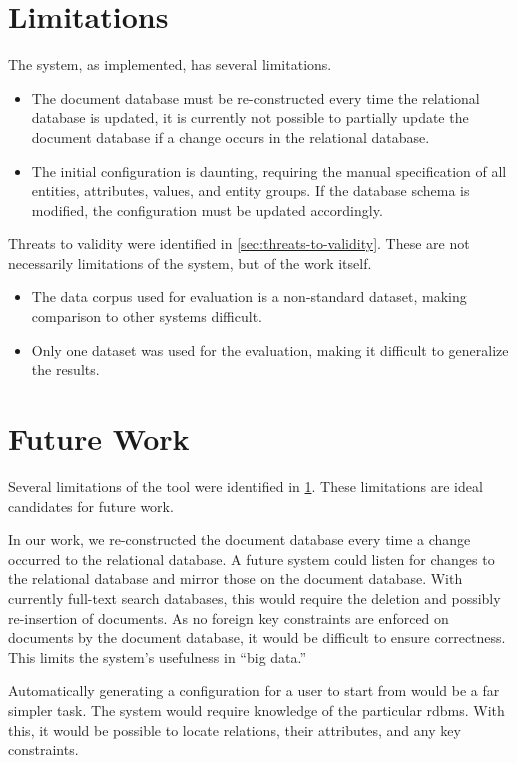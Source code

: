 	\section{Limitations}
	\label{sec:limitations}
		The system, as implemented, has several limitations.
		
		\begin{itemize}
			\item The document database must be re-constructed every time the relational database is updated, it is currently not possible to partially update the document database if a change occurs in the relational database.
			\item The initial configuration is daunting, requiring the manual specification of all entities, attributes, values, and entity groups.  If the database schema is modified, the configuration must be updated accordingly.
		\end{itemize}
		
		Threats to validity were identified in \cref{sec:threats-to-validity}.  These are not necessarily limitations of the system, but of the work itself.
		
		\begin{itemize}
			\item The data corpus used for evaluation is a non-standard dataset, making comparison to other systems difficult.
			\item Only one dataset was used for the evaluation, making it difficult to generalize the results.
		\end{itemize}
	
	\section{Future Work}
		Several limitations of the tool were identified in \cref{sec:limitations}.  These limitations are ideal candidates for future work.
		
		In our work, we re-constructed the document database every time a change occurred to the relational database.  A future system could listen for changes to the relational database and mirror those on the document database.  With currently full-text search databases, this would require the deletion and possibly re-insertion of documents.  As no foreign key constraints are enforced on documents by the document database, it would be difficult to ensure correctness.  This limits the system's usefulness in ``big data.''
		
		Automatically generating a configuration for a user to start from would be a far simpler task.  The system would require knowledge of the particular \gls{rdbms}.  With this, it would be possible to locate relations, their attributes, and any key constraints.
		
